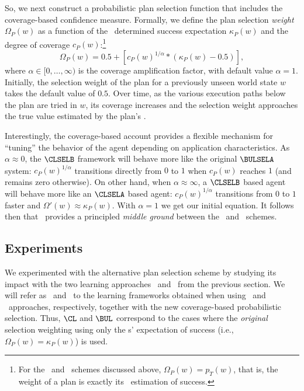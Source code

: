 So, we next construct a probabilistic plan selection function that includes the
coverage-based confidence measure.
Formally, we define the plan selection \emph{weight} $\Omega_P(w)$ as a function
of the \dt\ determined success expectation $\kappa_P(w)$ and the degree of
coverage $c_P(w)$:\footnote{For the \CL\ and \BUL\ schemes discussed above,
$\Omega_P(w)=p_T(w)$, that is, the weight of a plan is exactly its \dt\
estimation of success.}
\begin{equation*}\label{eqn:coverage}   
\Omega_P(w) = 0.5 + \left[  c_P(w)^{1/\alpha} *  \left( \kappa_P(w) - 0.5 \right)  \right], 
\end{equation*}
where $\alpha \in [0,\ldots,\infty)$ is the coverage amplification factor, with
default value $\alpha=1$.
Initially, the selection weight of the plan for a previously unseen world state
$w$ takes the default value of $0.5$.
Over time, as the various execution paths below the plan are tried in $w$, its
coverage increases and the selection weight approaches the true value estimated
by the plan's \dt.




Interestingly, the coverage-based account provides a flexible mechanism for
``tuning'' the behavior of the agent depending on application characteristics.
As $\alpha \approx 0$, the $\CLSELB$ framework will behave more like the original
$\BULSELA$ system: $c_P(w)^{1/\alpha}$ transitions directly from $0$ to $1$ when
$c_P(w)$ reaches $1$ (and remains zero otherwise).
On other hand, when $\alpha \approx \infty$, a $\CLSELB$ based agent will behave
more like an $\CLSELA$ based agent: $c_P(w)^{1/\alpha}$ transitions from $0$ to
$1$ faster and $\Omega'(w) \approx \kappa_P(w)$. With $\alpha=1$ we get our
initial equation.
It follows then that \CLSELB\ provides a principled \emph{middle ground} between
the \CLSELA\ and \BULSELA\ schemes.













\subsection{Experiments}


We experimented with the alternative plan selection scheme by studying its impact
with the two learning approaches \CL\ and \BUL\ from the previous section.
We will refer as \CLSELB\ and \BULSELB\ to the learning frameworks obtained when
using \CL\ and \BUL\ approaches, respectively, together with the new
coverage-based probabilistic selection.
Thus, $\CL$ and $\BUL$ correspond to the cases where the \emph{original}
selection weighting using only the \dt{}s' expectation of success (i.e.,
$\Omega_P(w) = \kappa_P(w)$) is used.



